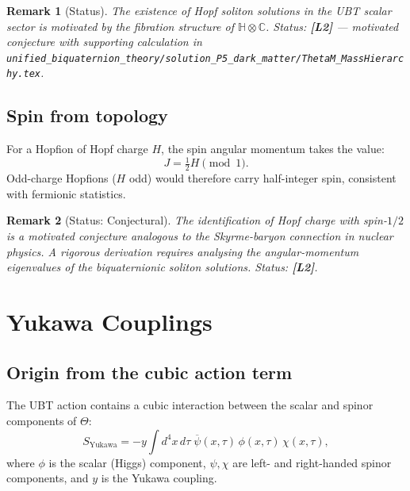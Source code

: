 \documentclass[11pt,a4paper]{article}
\newtheorem{remark}{Remark}
\begin{document}
\begin{remark}[Status]
  The existence of Hopf soliton solutions in the UBT scalar sector is
  motivated by the fibration structure of $\mathbb{H}\otimes\mathbb{C}$.
  Status: \textbf{[L2]} — motivated conjecture with supporting calculation in
  \texttt{unified\_biquaternion\_theory/solution\_P5\_dark\_matter/ThetaM\_MassHierarchy.tex}.
\end{remark}

\subsection{Spin from topology}

For a Hopfion of Hopf charge $H$, the spin angular momentum takes the
value:
\begin{equation}
  J = \tfrac{1}{2} H \pmod{1}.
\end{equation}
Odd-charge Hopfions ($H$ odd) would therefore carry half-integer spin,
consistent with fermionic statistics.

\begin{remark}[Status: Conjectural]
  The identification of Hopf charge with spin-$1/2$ is a motivated
  conjecture analogous to the Skyrme-baryon connection in nuclear physics.
  A rigorous derivation requires analysing the angular-momentum eigenvalues
  of the biquaternionic soliton solutions.
  Status: \textbf{[L2]}.
\end{remark}

\section{Yukawa Couplings}
\label{sec:yukawa}

\subsection{Origin from the cubic action term}

The UBT action contains a cubic interaction between the scalar and spinor
components of $\Theta$:
\begin{equation}
\label{eq:yukawa_action}
  S_{\mathrm{Yukawa}}
  = -y\int d^4x\, d\tau\;
    \overline{\psi}(x,\tau)\, \phi(x,\tau)\, \chi(x,\tau),
\end{equation}
where $\phi$ is the scalar (Higgs) component, $\psi, \chi$ are left- and
right-handed spinor components, and $y$ is the Yukawa coupling.
\end{document}
